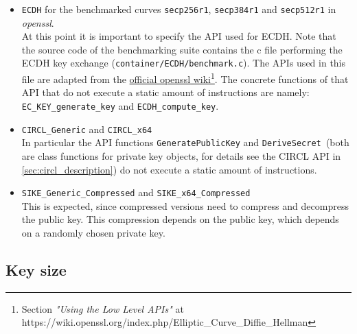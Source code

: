 \begin{itemize}
\item \texttt{\gls{ECDH}} for the benchmarked curves \texttt{secp256r1},  \texttt{secp384r1} and \texttt{secp512r1} in \textit{\gls{openssl}}.\\
At this point it is important to specify the API used for \gls{ECDH}. Note that the source code of the benchmarking suite contains the c file performing the \gls{ECDH} key exchange (\texttt{container/ECDH/benchmark.c}). The APIs used in this file are adapted from the \href{https://wiki.openssl.org/index.php/Elliptic\_Curve\_Diffie\_Hellman}{official \gls{openssl} wiki}\footnote{Section \textit{"Using the Low Level APIs"} at https://wiki.openssl.org/index.php/Elliptic\_Curve\_Diffie\_Hellman}. The concrete functions of that API that do not execute a static amount of instructions are namely: \texttt{EC\_KEY\_generate\_key} and \texttt{ECDH\_compute\_key}.
\item \texttt{\gls{CIRCL}\_Generic} and \texttt{\gls{CIRCL}\_x64}\\
In particular the API functions \texttt{GeneratePublicKey} and \texttt{DeriveSecret }(both are class functions for private key objects, for details see the \gls{CIRCL} API in \autoref{sec:circl_description}) do not execute a static amount of instructions.
\item \texttt{\gls{SIKE}\_Generic\_Compressed} and \texttt{\gls{SIKE}\_x64\_Compressed}\\
This is expected, since compressed versions need to compress and decompress the public key. This compression depends on the public key, which depends on a randomly chosen private key. 
\end{itemize}

\subsection{Key size}\label{sec:analysis_security_keys}

